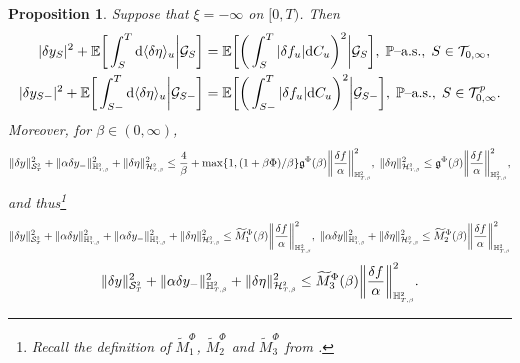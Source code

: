 \documentclass[10pt]{article} %
\newtheorem{proposition}[theorem]{Proposition}
\newcommand\cG{\mathcal G}
\newcommand\cH{\mathcal H}
\newcommand\cS{\mathcal S}
\newcommand\cT{\mathcal T}
\newcommand{\smalltext}[1]{\text{\fontsize{4}{4}\selectfont$#1$}}
\newcommand\fg{\mathfrak g}
\def \E{\mathbb{E}}
\def \H{\mathbb{H}}
\def \P{\mathbb{P}}
\newcommand{\1}{\mathbf{1}}
\def\d{\mathrm{d}}
\begin{document}
\begin{proposition}\label{prop::apriori_bsde}
	Suppose that $\xi = -\infty$ on $[0,T)$. Then
	\begin{align*}
		|\delta y_S|^2 +\E\bigg[\int_S^T \d \langle\delta\eta\rangle_u \bigg| \cG_S\bigg] &= \E\bigg[\bigg(\int_S^T |\delta f_u| \d C_u\bigg)^2\bigg| \cG_S\bigg], \; \text{$\P$\rm--a.s.}, \; S \in \cT_{0,\infty},\\
		|\delta y_{S-}|^2 +\E\bigg[\int_{S-}^T \d \langle\delta\eta\rangle_u \bigg| \cG_{S-}\bigg] &= \E\bigg[\bigg(\int_{S-}^T |\delta f_u| \d C_u\bigg)^2\bigg| \cG_{S-}\bigg], \; \text{$\P$\rm--a.s.}, \; S \in \cT^p_{0,\infty}.
	\end{align*}
	Moreover, for $\beta \in (0,\infty)$,
	\begin{equation*}
		\|\delta y\|^2_{\cS^\smalltext{2}_\smalltext{T}} + \|\alpha\delta y_{-}\|^2_{\H^\smalltext{2}_{\smalltext{T}\smalltext{,}\smalltext{\beta}}} + \|\delta\eta\|^2_{\cH^\smalltext{2}_{\smalltext{T}\smalltext{,}\smalltext{\beta}}} 
		\leq \frac{4}{\beta} + \max\{1,(1+\beta\Phi)/\beta\}\fg^\Phi(\beta) \bigg\|\frac{\delta f}{\alpha}\bigg\|^2_{\H^\smalltext{2}_{\smalltext{T}\smalltext{,}\smalltext{\beta}}},\;
		\|\delta\eta\|^2_{\cH^\smalltext{2}_{\smalltext{T}\smalltext{,}\smalltext{\beta}}} 
		\leq\fg^\Phi(\beta) \bigg\|\frac{\delta f}{\alpha}\bigg\|^2_{\H^\smalltext{2}_{\smalltext{T}\smalltext{,}\smalltext{\beta}}},
	\end{equation*}
	and thus\footnote{Recall the definition of $\widetilde M^\Phi_1$, $\widetilde M^\Phi_2$ and $\widetilde M^\Phi_3$ from .}
	\begin{equation*}
		\|\delta y\|^2_{\cS^\smalltext{2}_\smalltext{T}} + \|\alpha\delta y\|^2_{\H^\smalltext{2}_{\smalltext{T}\smalltext{,}\smalltext{\beta}}} + \|\alpha\delta y_{-}\|^2_{\H^\smalltext{2}_{\smalltext{T}\smalltext{,}\smalltext{\beta}}} + \|\delta\eta\|^2_{\cH^\smalltext{2}_{\smalltext{T}\smalltext{,}\smalltext{\beta}}} 
		\leq \widetilde M^\Phi_1(\beta) \bigg\|\frac{\delta f}{\alpha}\bigg\|^2_{\H^\smalltext{2}_{\smalltext{T}\smalltext{,}\smalltext{\beta}}},
		\;
		\|\alpha\delta y\|^2_{\H^\smalltext{2}_{\smalltext{T}\smalltext{,}\smalltext{\beta}}} + \|\delta\eta\|^2_{\cH^\smalltext{2}_{\smalltext{T}\smalltext{,}\smalltext{\beta}}} 
		\leq \widetilde M^\Phi_2(\beta) \bigg\|\frac{\delta f}{\alpha}\bigg\|^2_{\H^\smalltext{2}_{\smalltext{T}\smalltext{,}\smalltext{\beta}}}
	\end{equation*}
	\begin{equation*}
		\|\delta y\|^2_{\cS^\smalltext{2}_\smalltext{T}} + \|\alpha\delta y_{-}\|^2_{\H^\smalltext{2}_{\smalltext{T}\smalltext{,}\smalltext{\beta}}} + \|\delta\eta\|^2_{\cH^\smalltext{2}_{\smalltext{T}\smalltext{,}\smalltext{\beta}}} 
		\leq \widetilde M^\Phi_3(\beta) \bigg\|\frac{\delta f}{\alpha}\bigg\|^2_{\H^\smalltext{2}_{\smalltext{T}\smalltext{,}\smalltext{\beta}}}.
	\end{equation*}
\end{proposition}
\end{document}
